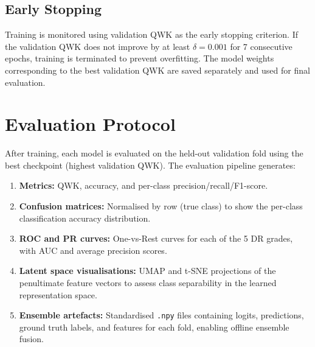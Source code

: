 \subsection{Early Stopping}

Training is monitored using validation QWK as the early stopping criterion. If the validation QWK does not improve by at least $\delta = 0.001$ for 7 consecutive epochs, training is terminated to prevent overfitting. The model weights corresponding to the best validation QWK are saved separately and used for final evaluation.

\section{Evaluation Protocol}
\label{sec:eval_protocol}

After training, each model is evaluated on the held-out validation fold using the best checkpoint (highest validation QWK). The evaluation pipeline generates:
\begin{enumerate}
    \item \textbf{Metrics:} QWK, accuracy, and per-class precision/recall/F1-score.
    \item \textbf{Confusion matrices:} Normalised by row (true class) to show the per-class classification accuracy distribution.
    \item \textbf{ROC and PR curves:} One-vs-Rest curves for each of the 5 DR grades, with AUC and average precision scores.
    \item \textbf{Latent space visualisations:} UMAP \cite{mcinnes2018umap} and t-SNE \cite{vandermaaten2008tsne} projections of the penultimate feature vectors to assess class separability in the learned representation space.
    \item \textbf{Ensemble artefacts:} Standardised \texttt{.npy} files containing logits, predictions, ground truth labels, and features for each fold, enabling offline ensemble fusion.
\end{enumerate}
